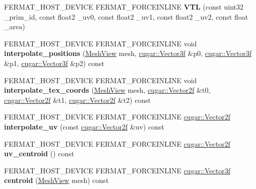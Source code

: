 \begin{DoxyCompactItemize}
\item 
\mbox{\label{struct_v_t_l_ab1ced26e0c81827d6838ae73dc2a84cb}} 
F\+E\+R\+M\+A\+T\+\_\+\+H\+O\+S\+T\+\_\+\+D\+E\+V\+I\+CE F\+E\+R\+M\+A\+T\+\_\+\+F\+O\+R\+C\+E\+I\+N\+L\+I\+NE {\bfseries V\+TL} (const uint32 \+\_\+prim\+\_\+id, const float2 \+\_\+uv0, const float2 \+\_\+uv1, const float2 \+\_\+uv2, const float \+\_\+area)
\item 
\mbox{\label{struct_v_t_l_a77b478dfa98bb60b61e55b982c4c35e7}} 
F\+E\+R\+M\+A\+T\+\_\+\+H\+O\+S\+T\+\_\+\+D\+E\+V\+I\+CE F\+E\+R\+M\+A\+T\+\_\+\+F\+O\+R\+C\+E\+I\+N\+L\+I\+NE void {\bfseries interpolate\+\_\+positions} (\hyperlink{struct_mesh_view}{Mesh\+View} mesh, \hyperlink{structcugar_1_1_vector}{cugar\+::\+Vector3f} \&p0, \hyperlink{structcugar_1_1_vector}{cugar\+::\+Vector3f} \&p1, \hyperlink{structcugar_1_1_vector}{cugar\+::\+Vector3f} \&p2) const
\item 
\mbox{\label{struct_v_t_l_a26ee50ff4504c2bca6aad0c785b0e717}} 
F\+E\+R\+M\+A\+T\+\_\+\+H\+O\+S\+T\+\_\+\+D\+E\+V\+I\+CE F\+E\+R\+M\+A\+T\+\_\+\+F\+O\+R\+C\+E\+I\+N\+L\+I\+NE void {\bfseries interpolate\+\_\+tex\+\_\+coords} (\hyperlink{struct_mesh_view}{Mesh\+View} mesh, \hyperlink{structcugar_1_1_vector}{cugar\+::\+Vector2f} \&t0, \hyperlink{structcugar_1_1_vector}{cugar\+::\+Vector2f} \&t1, \hyperlink{structcugar_1_1_vector}{cugar\+::\+Vector2f} \&t2) const
\item 
\mbox{\label{struct_v_t_l_a15329f4b5d8557baa3c5b3d603eb7747}} 
F\+E\+R\+M\+A\+T\+\_\+\+H\+O\+S\+T\+\_\+\+D\+E\+V\+I\+CE F\+E\+R\+M\+A\+T\+\_\+\+F\+O\+R\+C\+E\+I\+N\+L\+I\+NE \hyperlink{structcugar_1_1_vector}{cugar\+::\+Vector2f} {\bfseries interpolate\+\_\+uv} (const \hyperlink{structcugar_1_1_vector}{cugar\+::\+Vector2f} \&uv) const
\item 
\mbox{\label{struct_v_t_l_ae400f21873e4afb763c14b823d6d5299}} 
F\+E\+R\+M\+A\+T\+\_\+\+H\+O\+S\+T\+\_\+\+D\+E\+V\+I\+CE F\+E\+R\+M\+A\+T\+\_\+\+F\+O\+R\+C\+E\+I\+N\+L\+I\+NE \hyperlink{structcugar_1_1_vector}{cugar\+::\+Vector2f} {\bfseries uv\+\_\+centroid} () const
\item 
\mbox{\label{struct_v_t_l_a7a2425a9670795ba12fa96b7f797eac4}} 
F\+E\+R\+M\+A\+T\+\_\+\+H\+O\+S\+T\+\_\+\+D\+E\+V\+I\+CE F\+E\+R\+M\+A\+T\+\_\+\+F\+O\+R\+C\+E\+I\+N\+L\+I\+NE \hyperlink{structcugar_1_1_vector}{cugar\+::\+Vector3f} {\bfseries centroid} (\hyperlink{struct_mesh_view}{Mesh\+View} mesh) const
\end{DoxyCompactItemize}
